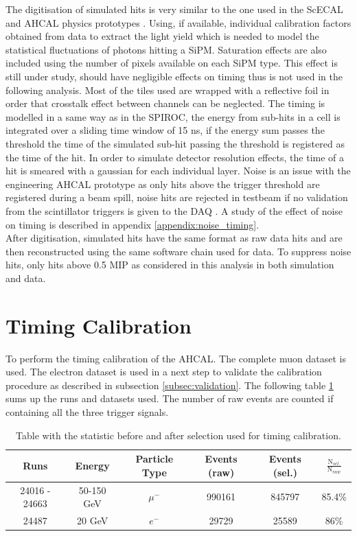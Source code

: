 \documentclass[twoside,a4paper,11pt]{article}
\begin{document}
The digitisation of simulated hits is very similar to the one used in the ScECAL and AHCAL physics prototypes \cite{CAN-002, CAN-010, JINST-6}. Using, if available, individual calibration factors obtained from data to extract the light yield which is needed to model the statistical fluctuations of photons hitting a SiPM. Saturation effects are also included using the number of pixels available on each SiPM type. This effect is still under study, should have negligible effects on timing thus is not used in the following analysis. Most of the tiles used are wrapped with a reflective foil in order that crosstalk effect between channels can be neglected. The timing is modelled in a same way as in the SPIROC, the energy from sub-hits in a cell is integrated over a sliding time window of 15 ns, if the energy sum passes the threshold the time of the simulated sub-hit passing the threshold is registered as the time of the hit. In order to simulate detector resolution effects, the time of a hit is smeared with a gaussian for each individual layer. Noise is an issue with the engineering AHCAL prototype as only hits above the trigger threshold are registered during a beam spill, noise hits are rejected in testbeam if no validation from the scintillator triggers is given to the DAQ \cite{DAQ}. A study of the effect of noise on timing is described in appendix \ref{appendix:noise_timing}.\\
After digitisation, simulated hits have the same format as raw data hits and are then reconstructed using the same software chain used for data. To suppress noise hits, only hits above 0.5 MIP as considered in this analysis in both simulation and data.

\section{Timing Calibration}
To perform the timing calibration of the AHCAL. The complete muon dataset is used. The electron dataset is used in a next step to validate the calibration procedure as described in subsection \ref{subsec:validation}. The following table \ref{table:mu_elec_runs} sums up the runs and datasets used. The number of raw events are counted if containing all the three trigger signals.
\begin{table}[htbp]
\centering
  \begin{tabular}{@{} cccccc @{}}
    \hline
    Runs & Energy & Particle Type & Events (raw) & Events (sel.) & $\frac{\text{N$_{sel.}$}}{\text{N$_{raw}$}}$ \\ 
    \hline
     24016 - 24663 & 50-150 GeV & $\mu^-$ & 990161 & 845797 & 85.4\% \\ 
     24487 & 20 GeV & $e^-$ & 29729 & 25589 & 86\% \\
    \hline
  \end{tabular}
  \caption{Table with the statistic before and after selection used for timing calibration.}
  \label{table:mu_elec_runs}
\end{table}
\end{document}
